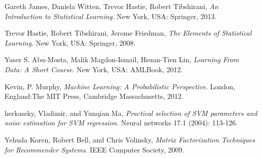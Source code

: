 \documentclass{article}
\begin{document}
\begin{spacing}{1}
\begin{large}
\begin{thebibliography}{9}
	Gareth James, Daniela Witten, Trevor Hastie, Robert Tibshirani, \textit{An Introduction to Statistical Learning}. New York, USA: Springer, 2013.
	
	Trevor Hastie, Robert Tibshirani, Jerome Friedman, \textit{The Elements of Statistical Learning}. New York, USA: Springer, 2008.
	
	Yaser S. Abu-Mosta, Malik Magdon-Ismail, Hsuan-Tien Lin, \textit{Learning From Data: A Short Course}. New York, USA: AMLBook, 2012.
	
	Kevin, P. Murphy, \textit{Machine Learning: A Probabilistic Perspective}. London, England:The MIT Press, Cambridge Massachusetts, 2012.
	
	herkassky, Vladimir, and Yunqian Ma, \textit{Practical selection of SVM parameters and noise estimation for SVM regression}. Neural networks 17.1 (2004): 113-126.
	
	Yehuda Koren, Robert Bell, and  Chris Volinsky,
	\textit{Matrix Factorization Techniques for Recommender Systems}. IEEE Computer Society, 2009.
\end{thebibliography}

\end{large}
\end{spacing}
\end{document}
